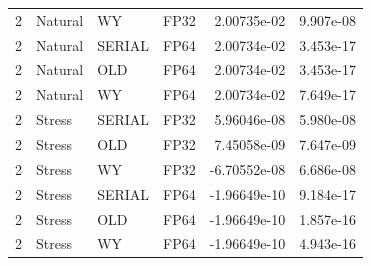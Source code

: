 \begin{tabular}{lllr rr}
2 & Natural & WY & FP32 & 2.00735e-02 & 9.907e-08 \\
2 & Natural & SERIAL & FP64 & 2.00734e-02 & 3.453e-17 \\
2 & Natural & OLD & FP64 & 2.00734e-02 & 3.453e-17 \\
2 & Natural & WY & FP64 & 2.00734e-02 & 7.649e-17 \\
2 & Stress & SERIAL & FP32 & 5.96046e-08 & 5.980e-08 \\
2 & Stress & OLD & FP32 & 7.45058e-09 & 7.647e-09 \\
2 & Stress & WY & FP32 & -6.70552e-08 & 6.686e-08 \\
2 & Stress & SERIAL & FP64 & -1.96649e-10 & 9.184e-17 \\
2 & Stress & OLD & FP64 & -1.96649e-10 & 1.857e-16 \\
2 & Stress & WY & FP64 & -1.96649e-10 & 4.943e-16 \\
\hline
\end{tabular}